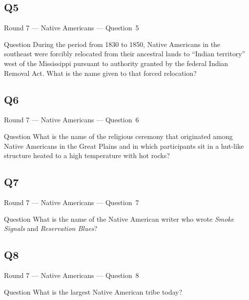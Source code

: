 \documentclass[11pt]{beamer}
\begin{document}
\subsection*{Q5}
\begin{frame}[t]{Round 7 --- Native Americans --- \mbox{Question 5}}
\vspace{-0.5em}
\begin{block}{Question}
During the period from 1830 to 1850, Native Americans in the southeast were forcibly relocated from their ancestral lands to ``Indian territory'' west of the Mississippi pursuant to authority granted by the federal Indian Removal Act.  What is the name given to that forced relocation?
\end{block}
\end{frame}
\subsection*{Q6}
\begin{frame}[t]{Round 7 --- Native Americans --- \mbox{Question 6}}
\vspace{-0.5em}
\begin{block}{Question}
What is the name of the religious ceremony that originated among Native Americans in the Great Plains and in which participants sit in a hut-like structure heated to a high temperature with hot rocks?
\end{block}
\end{frame}
\subsection*{Q7}
\begin{frame}[t]{Round 7 --- Native Americans --- \mbox{Question 7}}
\vspace{-0.5em}
\begin{block}{Question}
What is the name of the Native American writer who wrote \emph{Smoke Signals} and \emph{Reservation Blues}?
\end{block}
\end{frame}
\subsection*{Q8}
\begin{frame}[t]{Round 7 --- Native Americans --- \mbox{Question 8}}
\vspace{-0.5em}
\begin{block}{Question}
What is the largest Native American tribe today?
\end{block}
\end{frame}
\end{document}
